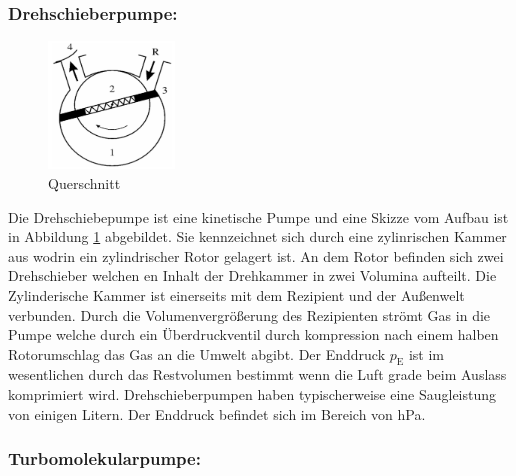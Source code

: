 \subsubsection{Drehschieberpumpe:}
\begin{figure}
    \vspace{-1cm}
    \centering
    \includegraphics[width=0.3\textwidth]{./picture/Drehschieberpumpe.png}
    \caption{Querschnitt \cite{??}}
    \label{fig:Dreh}
\end{figure}
Die Drehschiebepumpe ist eine kinetische Pumpe und eine Skizze vom Aufbau ist in Abbildung \ref{fig:Dreh} abgebildet. Sie kennzeichnet sich durch eine zylinrischen Kammer aus wodrin ein zylindrischer Rotor gelagert ist. An dem Rotor befinden sich zwei Drehschieber welchen en Inhalt der Drehkammer in zwei Volumina aufteilt. Die Zylinderische Kammer ist einerseits mit dem Rezipient und der Außenwelt verbunden. Durch die Volumenvergrößerung des Rezipienten strömt Gas in die Pumpe welche durch ein Überdruckventil durch kompression nach einem halben Rotorumschlag das Gas an die Umwelt abgibt. Der Enddruck $p_\text{E}$ ist im wesentlichen durch das Restvolumen bestimmt wenn die Luft grade beim Auslass komprimiert wird. Drehschieberpumpen haben typischerweise eine Saugleistung von einigen Litern. Der Enddruck befindet sich im Bereich von hPa. 


\subsubsection{Turbomolekularpumpe:}


